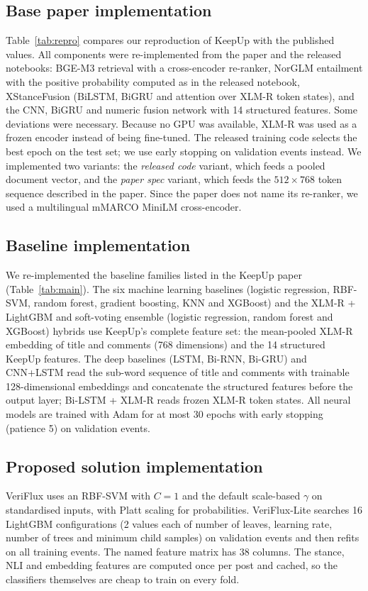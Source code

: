 \documentclass[conference]{IEEEtran}
\begin{document}
\subsection{Base paper implementation}
Table~\ref{tab:repro} compares our reproduction of KeepUp with the published values. All components were
re-implemented from the paper and the released notebooks: BGE-M3 \cite{chen2024bgem3} retrieval with a
cross-encoder re-ranker, NorGLM entailment with the positive probability computed as in the released notebook,
XStanceFusion (BiLSTM, BiGRU and attention over XLM-R token states), and the CNN, BiGRU and numeric fusion network
with 14 structured features. Some deviations were necessary. Because no GPU was available, XLM-R was used as a
frozen encoder instead of being fine-tuned. The released training code selects the best epoch on the test set;
we use early stopping on validation events instead. We implemented two variants: the \emph{released code}
variant, which feeds a pooled document vector, and the \emph{paper spec} variant, which feeds the
$512\times768$ token sequence described in the paper. Since the paper does not name its re-ranker, we used a
multilingual mMARCO MiniLM cross-encoder.



\subsection{Baseline implementation}
We re-implemented the baseline families listed in the KeepUp paper (Table~\ref{tab:main}). The six machine
learning baselines (logistic regression, RBF-SVM, random forest, gradient boosting, KNN and XGBoost) and the
XLM-R + LightGBM and soft-voting ensemble (logistic regression, random forest and XGBoost) hybrids use KeepUp's
complete feature set: the mean-pooled XLM-R embedding of title and comments (768 dimensions) and the 14
structured KeepUp features. The deep baselines (LSTM, Bi-RNN, Bi-GRU) and CNN+LSTM read the sub-word sequence of
title and comments with trainable 128-dimensional embeddings and concatenate the structured features before the
output layer; Bi-LSTM + XLM-R reads frozen XLM-R token states. All neural models are trained with Adam for at
most 30 epochs with early stopping (patience 5) on validation events.

\subsection{Proposed solution implementation}
VeriFlux uses an RBF-SVM with $C=1$ and the default scale-based $\gamma$ on standardised inputs, with Platt
scaling for probabilities. VeriFlux-Lite searches 16 LightGBM configurations (2 values each of number of leaves,
learning rate, number of trees and minimum child samples) on validation events and then refits on all training
events. The named feature matrix has 38 columns. The stance, NLI and embedding features are computed once per
post and cached, so the classifiers themselves are cheap to train on every fold.
\end{document}
